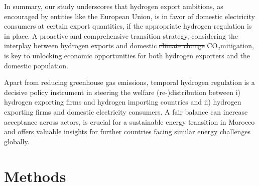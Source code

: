 \documentclass[5p,numafflabel]{elsarticle}
\newcommand{\co}{\ce{CO2}~}
\def\co{CO${}_2${\:}}
\providecommand{\DIFdeltex}[1]{{\protect\color{red}\sout{#1}}}                      %
\providecommand{\DIFaddbegin}{} %
\providecommand{\DIFaddend}{} %
\providecommand{\DIFdelbegin}{} %
\providecommand{\DIFdelend}{} %
\providecommand{\DIFdel}[1]{\texorpdfstring{\DIFdeltex{#1}}{}} %
\newcommand{\DIFscaledelfig}{0.5}
\newlength{\DIFdelgraphicswidth} %
\newlength{\DIFdelgraphicsheight} %
\newcommand{\DIFaddincludegraphics}[2][]{{\color{blue}\fbox{\DIFOincludegraphics[#1]{#2}}}} %
\newcommand{\DIFdelincludegraphics}[2][]{%
\sbox{\DIFdelgraphicsbox}{\DIFOincludegraphics[#1]{#2}}%
\settoboxwidth{\DIFdelgraphicswidth}{\DIFdelgraphicsbox} %
\settoboxtotalheight{\DIFdelgraphicsheight}{\DIFdelgraphicsbox} %
\scalebox{\DIFscaledelfig}{%
\parbox[b]{\DIFdelgraphicswidth}{\usebox{\DIFdelgraphicsbox}\\[-\baselineskip] \rule{\DIFdelgraphicswidth}{0em}}\llap{\resizebox{\DIFdelgraphicswidth}{\DIFdelgraphicsheight}{%
\setlength{\unitlength}{\DIFdelgraphicswidth}%
\begin{picture}(1,1)%
\thicklines\linethickness{2pt} %
{\color[rgb]{1,0,0}\put(0,0){\framebox(1,1){}}}%
{\color[rgb]{1,0,0}\put(0,0){\line( 1,1){1}}}%
{\color[rgb]{1,0,0}\put(0,1){\line(1,-1){1}}}%
\end{picture}%
}\hspace*{3pt}}} %
} %
\DeclareRobustCommand{\DIFaddbegin}{\DIFOaddbegin \let\includegraphics\DIFaddincludegraphics} %
\DeclareRobustCommand{\DIFaddend}{\DIFOaddend \let\includegraphics\DIFOincludegraphics} %
\DeclareRobustCommand{\DIFdelbegin}{\DIFOdelbegin \let\includegraphics\DIFdelincludegraphics} %
\DeclareRobustCommand{\DIFdelend}{\DIFOaddend \let\includegraphics\DIFOincludegraphics} %
\begin{document}
In summary, our study underscores that hydrogen export ambitions, as encouraged by entities like the European Union, is in favor of domestic electricity consumers at certain export quantities, if the appropriate hydrogen regulation is in place. A proactive and comprehensive transition strategy, considering the interplay between hydrogen exports and domestic \DIFdelbegin \DIFdel{climate change }\DIFdelend \DIFaddbegin \co \DIFaddend mitigation, is key to unlocking economic opportunities for both hydrogen exporters and the domestic population. 


Apart from reducing greenhouse gas emissions, temporal hydrogen regulation is a decisive policy instrument in steering the welfare (re-)distribution between i) hydrogen exporting firms and hydrogen importing countries and ii) hydrogen exporting firms and domestic electricity consumers. 
A fair balance can increase acceptance across actors, is crucial for a sustainable energy transition in Morocco and offers valuable insights for further countries facing similar energy challenges globally.


\section*{Methods}
\label{sec:methods}
\end{document}
